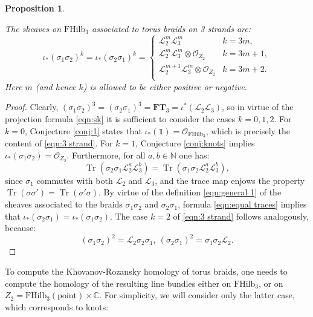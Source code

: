\documentclass[12pt]{amsart}
\numberwithin{equation}{section}
\newtheorem{proposition}[theorem]{Proposition}
\theoremstyle{definition}
\theoremstyle{remark}
\DeclareMathOperator{\Tr}{Tr}
\newcommand{\CC}{\mathbb{C}}
\newcommand{\NN}{\mathbb{N}}
\newcommand{\CL}{\mathcal{L}}
\newcommand{\CO}{\mathcal{O}}
\newcommand{\FT}{\mathbf{FT}}
\renewcommand{\1}{\mathbf{1}}
\newcommand{\FH}{\mathrm{FHilb}}
\newcommand{\point}{\mathrm{point}}
\begin{document}
\begin{proposition}
\label{prop:3 strand}

The sheaves on $\FH_3$ associated to torus braids on 3 strands are:
\begin{equation}
\label{eqn:3 strand}
\iota_{*}(\sigma_1\sigma_2)^{k} = \iota_{*}(\sigma_2\sigma_1)^{k} = 
\begin{cases}
\CL_2^{m}\CL_3^{m} & k=3m, \\
\CL_2^{m}\CL_3^{m}\otimes \CO_{Z_2}& k=3m+1,\\
\CL_2^{m+1}\CL_3^{m}\otimes \CO_{Z_2}& k=3m+2.\\
\end{cases}
\end{equation}
Here $m$ (and hence $k$) is allowed to be either positive or negative.
\end{proposition}

\begin{proof}
Clearly, $(\sigma_1\sigma_2)^3=(\sigma_2\sigma_1)^3=\FT_3= \iota^*(\CL_2\CL_3)$, so in virtue of the projection formula \eqref{eqn:sk} it is sufficient to consider the cases $k=0,1,2$. For $k=0$, Conjecture \ref{conj:1} states that $\iota_*(\1)=\CO_{\FH_3}$, which is precisely the content of \eqref{eqn:3 strand}. For $k=1$, Conjecture \ref{conj:knots} implies $\iota_*(\sigma_1\sigma_2)=\CO_{Z_2}$. Furthermore, for all $a, b \in \NN$ one has:
\begin{equation}
\label{eqn:equal traces}
\Tr(\sigma_2\sigma_1\CL_2^{a}\CL_3^{b})=\Tr(\sigma_1\sigma_2\CL_2^{a}\CL_3^{b}),
\end{equation}
since $\sigma_1$ commutes with both $\CL_2$ and $\CL_3$, and the trace map enjows the property $\Tr(\sigma\sigma') = \Tr(\sigma'\sigma)$. By virtue of the definition \eqref{eqn:general 1} of the sheaves associated to the braids $\sigma_1\sigma_2$ and $\sigma_2\sigma_1$, formula \eqref{eqn:equal traces} implies that $\iota_*(\sigma_2\sigma_1) = \iota_*(\sigma_1\sigma_2)$. The case $k=2$ of \eqref{eqn:3 strand} follows analogously, because:
$$
(\sigma_1\sigma_2)^2=\CL_2\sigma_2\sigma_1,\ (\sigma_2\sigma_1)^2=\sigma_1\sigma_2\CL_2.
$$
\end{proof}

To compute the Khovanov-Rozansky homology of torus braids, one needs to compute the homology of the resulting line bundles either on $\FH_3$, or on $Z_2=\FH_3(\point)\times \CC$. For simplicity, we will consider only the latter case, which corresponds to knots:
\end{document}
